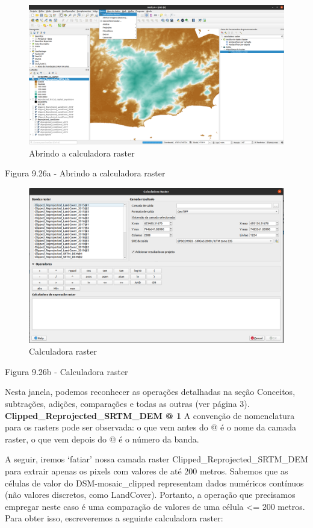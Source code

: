 \documentclass[
  portuguese,
]{krantz}
\begin{document}
\begin{figure}
\centering
\includegraphics{media/modulo9/fig926_a.png}
\caption{Abrindo a calculadora raster}
\end{figure}

Figura 9.26a - Abrindo a calculadora raster

\begin{figure}
\centering
\includegraphics{media/modulo9/fig926_b.png}
\caption{Calculadora raster}
\end{figure}

Figura 9.26b - Calculadora raster

Nesta janela, podemos reconhecer as operações detalhadas na seção Conceitos, subtrações, adições, comparações e todas as outras (ver página 3). \textbf{Clipped\_Reprojected\_SRTM\_DEM @ 1} A convenção de nomenclatura para os rasters pode ser observada: o que vem antes do @ é o nome da camada raster, o que vem depois do @ é o número da banda.

A seguir, iremos `fatiar' nossa camada raster Clipped\_Reprojected\_SRTM\_DEM para extrair apenas os pixels com valores de até 200 metros. Sabemos que as células de valor do DSM-mosaic\_clipped representam dados numéricos contínuos (não valores discretos, como LandCover). Portanto, a operação que precisamos empregar neste caso é uma comparação de valores de uma célula \textless= 200 metros. Para obter isso, escreveremos a seguinte calculadora raster:
\end{document}
